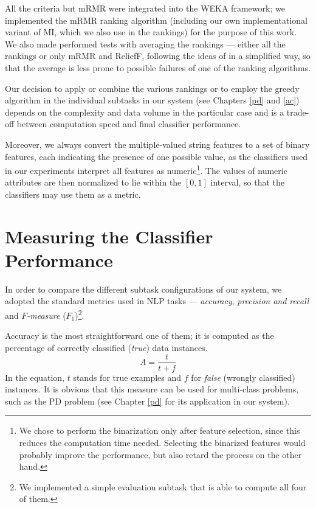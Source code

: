 \documentclass[12pt,notitlepage,a4paper]{report}
\begin{document}
All the criteria but mRMR were integrated into the WEKA framework; we implemented the mRMR ranking algorithm (including our own implementational variant of MI, which we also use in the rankings) for the purpose of this work. We also made performed tests with averaging the rankings --- either all the rankings or only mRMR and ReliefF, following the ideas of \citet{zhang08} in a simplified way, so that the average is less prone to possible failures of one of the ranking algorithms.

Our decision to apply or combine the various rankings or to employ the greedy algorithm in the individual subtasks in our system (see Chapters \ref{pd} and \ref{ac}) depends on the complexity and data volume in the particular case and is a trade-off between computation speed and final classifier performance.

Moreover, we always convert the multiple-valued string features to a set of binary features, each indicating the presence of one possible value, as the classifiers used in our experiments interpret all features as numeric\footnote{We chose to perform the binarization only after feature selection, since this reduces the computation time needed. Selecting the binarized features would probably improve the performance, but also retard the process on the other hand.}. The values of numeric attributes are then normalized \citep[p.~56f.]{witten05} to lie within the $[0,1]$ interval, so that the classifiers may use them as a metric.

\section{Measuring the Classifier Performance}\label{metrics}

In order to compare the different subtask configurations of our system, we adopted the standard metrics used in NLP tasks \citep[p.~268ff., p.~142ff., p.~171ff., respectively]{manning00,manning08,witten05} --- \emph{accuracy}, \emph{precision and recall}  and \emph{$F$-measure} ($F_1$)\footnote{We implemented a simple evaluation subtask that is able to compute all four of them.}.

Accuracy is the most straightforward one of them; it is computed as the percentage of correctly classified (\emph{true}) data instances.
\begin{equation}
A = \frac{t}{t + f}
\end{equation}
In the equation, $t$ stands for true examples and $f$ for \emph{false} (wrongly classified) instances. It is obvious that this measure can be used for multi-class problems, such as the PD problem (see Chapter \ref{pd} for its application in our system).
\end{document}
